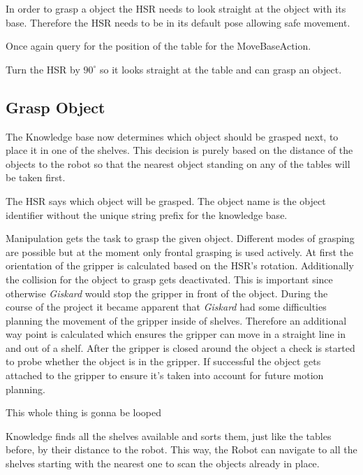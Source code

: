 \documentclass[main.tex]{subfiles}
\begin{document}
	In order to grasp a object the HSR needs to look straight at the object with its base. Therefore the HSR needs to be in its default pose allowing safe movement.
	
	
	Once again query for the position of the table for the MoveBaseAction.
	
	Turn the HSR by $90^\circ$ so it looks straight at the table and can grasp an object.
	
	\subsection{Grasp Object}
	\label{grasp-object}
	The Knowledge base now determines which object should be grasped next, to place it in one of the shelves. This decision is purely based on the distance of the objects to the robot so that the nearest object standing on any of the tables will be taken first.
	
	The HSR says which object will be grasped. The object name is the object identifier without the unique string prefix for the knowledge base.
	
	Manipulation gets the task to grasp the given object. Different modes of grasping are possible but at the moment only frontal grasping is used actively. At first the orientation of the gripper is calculated based on the HSR's rotation. Additionally the collision for the object to grasp gets deactivated. This is important since otherwise \textit{Giskard} would stop the gripper in front of the object. During the course of the project it became apparent that \textit{Giskard} had some difficulties planning the movement of the gripper inside of shelves. Therefore an additional way point is calculated which ensures the gripper can move in a straight line in and out of a shelf. After the gripper is closed around the object a check is started to probe whether the object is in the gripper. If successful the object gets attached to the gripper to ensure it's taken into account for future motion planning.   
	
	This whole thing is gonna be looped 
	
	
	Knowledge finds all the shelves available and sorts them, just like the tables before, by their distance to the robot. This way, the Robot can navigate to all the shelves starting with the nearest one to scan the objects already in place.
	
\end{document}
